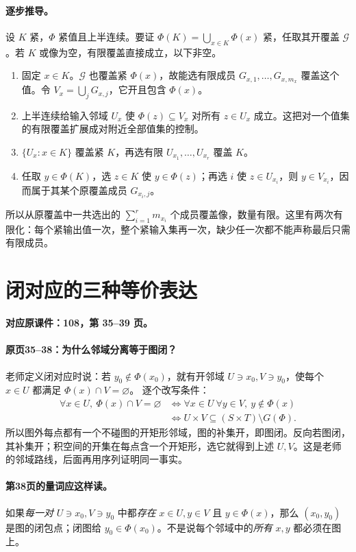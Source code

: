 \paragraph{逐步推导。}
设 $K$ 紧，$\Phi$ 紧值且上半连续。要证 $\Phi(K)=\bigcup_{x\in K}\Phi(x)$ 紧，任取其开覆盖 $\mathcal G$。若 $K$ 或像为空，有限覆盖直接成立，以下非空。
\begin{enumerate}
\item 固定 $x\in K$。$\mathcal G$ 也覆盖紧 $\Phi(x)$，故能选有限成员 $G_{x,1},\ldots,G_{x,m_x}$ 覆盖这个值。令 $V_x=\bigcup_jG_{x,j}$，它开且包含 $\Phi(x)$。
\item 上半连续给输入邻域 $U_x$ 使 $\Phi(z)\subseteq V_x$ 对所有 $z\in U_x$ 成立。这把对一个值集的有限覆盖扩展成对附近全部值集的控制。
\item $\{U_x:x\in K\}$ 覆盖紧 $K$，再选有限 $U_{x_1},\ldots,U_{x_r}$ 覆盖 $K$。
\item 任取 $y\in\Phi(K)$，选 $z\in K$ 使 $y\in\Phi(z)$；再选 $i$ 使 $z\in U_{x_i}$，则 $y\in V_{x_i}$，因而属于其某个原覆盖成员 $G_{x_i,j}$。
\end{enumerate}
所以从原覆盖中一共选出的 $\sum_{i=1}^r m_{x_i}$ 个成员覆盖像，数量有限。这里有两次有限化：每个紧输出值一次，整个紧输入集再一次，缺少任一次都不能声称最后只需有限成员。


\clearpage\section{闭对应的三种等价表达}\label{g:108:35}

\textbf{对应原课件：108，第 35--39 页。}


\paragraph{原页35--38：为什么邻域分离等于图闭？}
老师定义闭对应时说：若 $y_0\notin\Phi(x_0)$，就有开邻域 $U\ni x_0,V\ni y_0$，使每个 $x\in U$ 都满足 $\Phi(x)\cap V=\varnothing$。
逐个改写条件：
\begin{align*}
\forall x\in U,\ \Phi(x)\cap V=\varnothing
&\iff\forall x\in U\ \forall y\in V,\ y\notin\Phi(x)\\
&\iff U\times V\subseteq(S\times T)\setminus G(\Phi).
\end{align*}
所以图外每点都有一个不碰图的开矩形邻域，图的补集开，即图闭。反向若图闭，其补集开；积空间的开集在每点含一个开矩形，选它就得到上述 $U,V$。这是老师的邻域路线，后面再用序列证明同一事实。

\paragraph{第38页的量词应这样读。}
如果\emph{每一对} $U\ni x_0,V\ni y_0$ 中都\emph{存在} $x\in U,y\in V$ 且 $y\in\Phi(x)$，那么 $(x_0,y_0)$ 是图的闭包点；闭图给 $y_0\in\Phi(x_0)$。不是说每个邻域中的\emph{所有} $x,y$ 都必须在图上。


